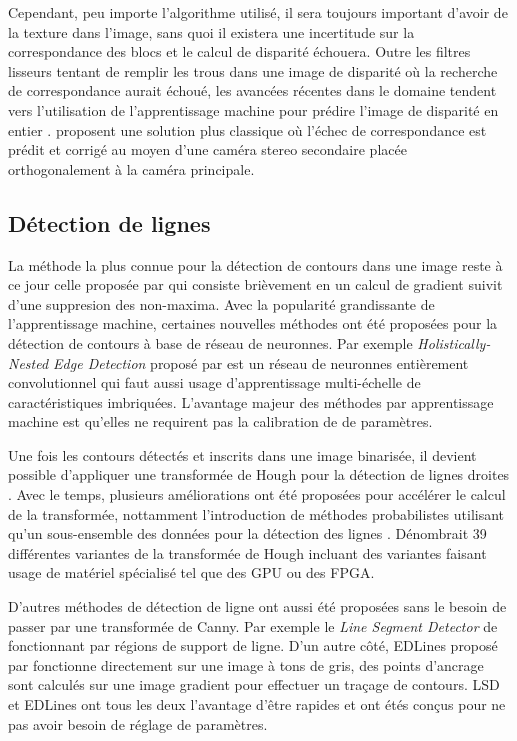 Cependant, peu importe l'algorithme utilisé, il sera toujours important d'avoir de la texture dans l'image, sans quoi il existera une incertitude sur la correspondance des blocs et le calcul de disparité échouera. Outre les filtres lisseurs tentant de remplir les trous dans une image de disparité où la recherche de correspondance aurait échoué, les avancées récentes dans le domaine tendent vers l'utilisation de l'apprentissage machine pour prédire l'image de disparité en entier \citep{Kendall_2017_ICCV}. \cite{meier2017real} proposent une solution plus classique où l'échec de correspondance est prédit et corrigé au moyen d'une caméra stereo secondaire placée orthogonalement à la caméra principale.

\subsection{Détection de lignes}

La méthode la plus connue pour la détection de contours dans une image reste à ce jour celle proposée par \cite{Canny1986} qui consiste brièvement en un calcul de gradient suivit d'une suppresion des non-maxima. Avec la popularité grandissante de l'apprentissage machine, certaines nouvelles méthodes ont été proposées pour la détection de contours à base de réseau de neuronnes. Par exemple \textit{Holistically-Nested Edge Detection} proposé par \cite{Xie2015} est un réseau de neuronnes entièrement convolutionnel qui faut aussi usage d'apprentissage multi-échelle de caractéristiques imbriquées. L'avantage majeur des méthodes par apprentissage machine est qu'elles ne requirent pas la calibration de de paramètres.

Une fois les contours détectés et inscrits dans une image binarisée, il devient possible d'appliquer une transformée de Hough pour la détection de lignes droites \citep{Duda:1972}. Avec le temps, plusieurs améliorations ont été proposées pour accélérer le calcul de la transformée, nottamment l'introduction de méthodes probabilistes utilisant qu'un sous-ensemble des données pour la détection des lignes \citep{Matas2000}. \citep{Herout2013} Dénombrait 39 différentes variantes de la transformée de Hough incluant des variantes faisant usage de matériel spécialisé tel que des GPU ou des FPGA.

D'autres méthodes de détection de ligne ont aussi été proposées sans le besoin de passer par une transformée de Canny. Par exemple le \textit{Line Segment Detector} de \citep{Gioi2012lsd} fonctionnant par régions de support de ligne. D'un autre côté, EDLines proposé par \citep{AKINLAR20111633} fonctionne directement sur une image à tons de gris, des points d'ancrage sont calculés sur une image gradient pour effectuer un traçage de contours. LSD et EDLines ont tous les deux l'avantage d'être rapides et ont étés conçus pour ne pas avoir besoin de réglage de paramètres.

